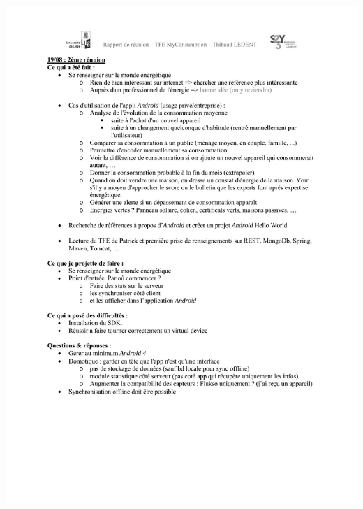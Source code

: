 \documentclass[a4paper, oneside, 11pt]{book}
\begin{document}
\includegraphics[width=1\textwidth]{reports_NB_Part2.pdf}
\newpage
\end{document}
